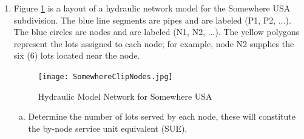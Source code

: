 \documentclass[12pt]{article}
\begin{document}
\begin{enumerate}
%
%
\item Figure \ref{fig:water_network_layout} is a layout of a hydraulic network model for the Somewhere USA subdivision.   
The blue line segments are pipes and are labeled (P1, P2, $\dots$).   
The blue circles are nodes and are labeled (N1, N2, $\dots$).
The yellow polygons represent the lots assigned to each node; for example, node N2 supplies the six (6) lots located near the node.
\begin{figure}[ht!] %
   \centering
   \texttt{[image: SomewhereClipNodes.jpg]} 
   \caption{Hydraulic Model Network for Somewhere USA}
   \label{fig:water_network_layout}
\end{figure}
\begin{enumerate}[a)]
\item Determine the number of lots served by each node, these will constitute the by-node service unit equivalent (SUE).


\end{enumerate}
\end{enumerate}
\end{document}
